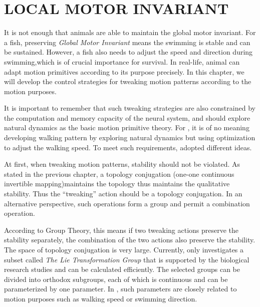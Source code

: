 \chapter{LOCAL MOTOR INVARIANT}
\label{chap:li}

\graphicspath{{LocalInvariant/LocalInvariantFigs/EPS/}{LocalInvariant/LocalInvariantFigs/}}
It is not enough that animals are able to maintain the global motor invariant.
For a fish, preserving \emph{Global Motor Invariant}  means the swimming is stable and can be sustained.
However,  a fish also needs to adjust the speed and direction during swimming,which is of crucial importance for survival.
In real-life, animal can adapt motion primitives according to its purpose precisely.
In this chapter, we will develop the control strategies for tweaking motion patterns according to the motion purposes.

It is important to remember that such tweaking strategies are also constrained by the computation and memory capacity of the neural system, and should explore natural dynamics as the basic motion primitive theory. 
For \cms, it is of no meaning developing walking pattern by exploring natural dynamics but using optimization to adjust the walking speed. 
To meet such requirements, \moit adopted different ideas.

At first, when tweaking motion patterns, stability should not be violated. 
As stated in the previous chapter, a topology conjugation (one-one continuous invertible mapping)maintains the topology thus maintains the qualitative stability. Thus the ``tweaking'' action should be a topology conjugation. In an alternative perspective, such operations form a group and permit a combination operation. 

According to Group Theory, this means if two tweaking actions preserve the stability separately, the combination of the two actions also preserve the stability.
The space of topology conjugation is very large.
Currently, \moit only investigates a subset called \emph{The Lie Transformation Group} that is supported by the biological research studies and can be calculated efficiently.
The selected groups can be divided into orthodox subgroups, each of which is continuous and can be parameterized by one parameter.
In \cms, such parameters are closely related to motion purposes such as walking speed or swimming direction.

